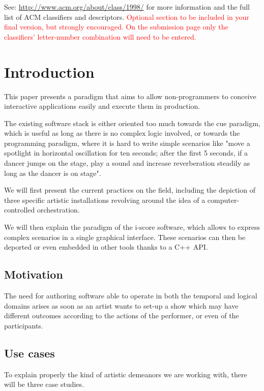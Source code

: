 \documentclass{sigchi}
\begin{document}

See: \url{http://www.acm.org/about/class/1998/}
for more information and the full list of ACM classifiers
and descriptors. \newline
\textcolor{red}{Optional section to be included in your final version, 
but strongly encouraged. On the submission page only the classifiers’ 
letter-number combination will need to be entered.}

\section{Introduction}
This paper presents a paradigm that aims to allow non-programmers 
to conceive interactive applications easily and execute them in production.

The existing software stack is either oriented too much towards the 
cue paradigm, which is useful as long as there is no complex logic involved, 
or towards the programming paradigm, where it is hard to write simple scenarios 
like "move a spotlight in horizontal oscillation for ten seconds; after the first 5 
seconds, if a dancer jumps on the stage, play a sound and increase reverberation steadily as long as the dancer is on stage".

We will first present the current practices on the field, including the depiction of three specific artistic installations revolving around the idea of a computer-controlled orchestration.

We will then explain the paradigm of the i-score software, which allows to express complex scenarios in a single graphical interface. These scenarios can then be deported or even embedded in other tools thanks to a C++ API. 
\subsection{Motivation}
The need for authoring software able to operate in both the temporal and logical domains arises as soon as an artist wants to set-up a show which may have different outcomes according to the actions of the performer, or even of the participants.

\subsection{Use cases}
To explain properly the kind of artistic demeanors we are working with, there will be three case studies.
\end{document}
